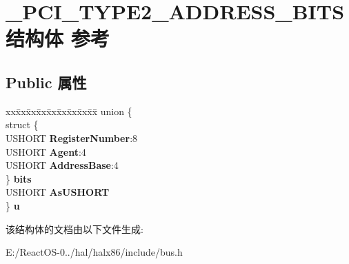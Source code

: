\hypertarget{struct___p_c_i___t_y_p_e2___a_d_d_r_e_s_s___b_i_t_s}{}\section{\+\_\+\+P\+C\+I\+\_\+\+T\+Y\+P\+E2\+\_\+\+A\+D\+D\+R\+E\+S\+S\+\_\+\+B\+I\+T\+S结构体 参考}
\label{struct___p_c_i___t_y_p_e2___a_d_d_r_e_s_s___b_i_t_s}
\subsection*{Public 属性}
\begin{DoxyCompactItemize}
\item 
\mbox{\label{struct___p_c_i___t_y_p_e2___a_d_d_r_e_s_s___b_i_t_s_a2387040163e95ac70db5d768c02130d5}} 
\begin{tabbing}
xx\=xx\=xx\=xx\=xx\=xx\=xx\=xx\=xx\=\kill
union \{\\
\>struct \{\\
\>\>USHORT {\bfseries RegisterNumber}:8\\
\>\>USHORT {\bfseries Agent}:4\\
\>\>USHORT {\bfseries AddressBase}:4\\
\>\} {\bfseries bits}\\
\>USHORT {\bfseries AsUSHORT}\\
\} {\bfseries u}\\

\end{tabbing}\end{DoxyCompactItemize}


该结构体的文档由以下文件生成\+:\begin{DoxyCompactItemize}
\item 
E\+:/\+React\+O\+S-\/0../hal/halx86/include/bus.\+h\end{DoxyCompactItemize}
